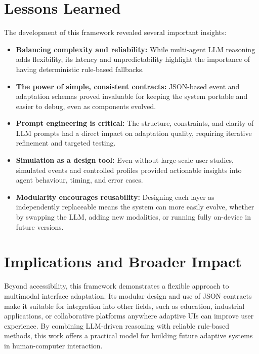 \documentclass[openany]{book}
\begin{document}
\section{Lessons Learned}
The development of this framework revealed several important insights:
\begin{itemize}
    \item \textbf{Balancing complexity and reliability:} While multi-agent LLM reasoning adds flexibility, its latency and unpredictability highlight the importance of having deterministic rule-based fallbacks.
    \item \textbf{The power of simple, consistent contracts:} JSON-based event and adaptation schemas proved invaluable for keeping the system portable and easier to debug, even as components evolved.
    \item \textbf{Prompt engineering is critical:} The structure, constraints, and clarity of LLM prompts had a direct impact on adaptation quality, requiring iterative refinement and targeted testing.
    \item \textbf{Simulation as a design tool:} Even without large-scale user studies, simulated events and controlled profiles provided actionable insights into agent behaviour, timing, and error cases.
    \item \textbf{Modularity encourages reusability:} Designing each layer as independently replaceable means the system can more easily evolve, whether by swapping the LLM, adding new modalities, or running fully on-device in future versions.
\end{itemize}

\section{Implications and Broader Impact}
Beyond accessibility, this framework demonstrates a flexible approach to multimodal interface adaptation. Its modular design and use of JSON contracts make it suitable for integration into other fields, such as education, industrial applications, or collaborative platforms anywhere adaptive UIs can improve user experience. By combining LLM-driven reasoning with reliable rule-based methods, this work offers a practical model for building future adaptive systems in human-computer interaction.
\end{document}
